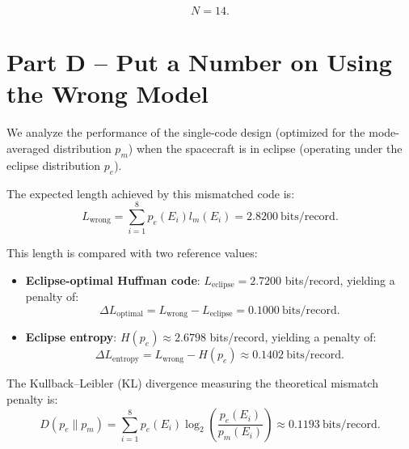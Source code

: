 \documentclass[11pt,a4paper]{article}
\begin{document}
\begin{equation}
    \boxed{N=14}.
\end{equation}


\section{Part D -- Put a Number on Using the Wrong Model}

We analyze the performance of the single-code design (optimized for the mode-averaged distribution \(p_m\)) when the spacecraft is in eclipse (operating under the eclipse distribution \(p_e\)).

The expected length achieved by this mismatched code is:
\begin{equation}
    L_{\mathrm{wrong}} = \sum_{i=1}^{8} p_e(E_i) l_m(E_i) = \boxed{2.8200\ \text{bits/record}}.
\end{equation}

This length is compared with two reference values:
\begin{itemize}
    \item \textbf{Eclipse-optimal Huffman code}: \(L_{\mathrm{eclipse}} = 2.7200\) bits/record, yielding a penalty of:
    \begin{equation}
        \Delta L_{\mathrm{optimal}} = L_{\mathrm{wrong}} - L_{\mathrm{eclipse}} = \boxed{0.1000\ \text{bits/record}}.
    \end{equation}
    \item \textbf{Eclipse entropy}: \(H(p_e) \approx 2.6798\) bits/record, yielding a penalty of:
    \begin{equation}
        \Delta L_{\mathrm{entropy}} = L_{\mathrm{wrong}} - H(p_e) \approx \boxed{0.1402\ \text{bits/record}}.
    \end{equation}
\end{itemize}

The Kullback--Leibler (KL) divergence measuring the theoretical mismatch penalty is:
\begin{equation}
    D(p_e \parallel p_m) = \sum_{i=1}^{8} p_e(E_i) \log_2 \left(\frac{p_e(E_i)}{p_m(E_i)}\right) \approx \boxed{0.1193\ \text{bits/record}}.
\end{equation}
\end{document}

